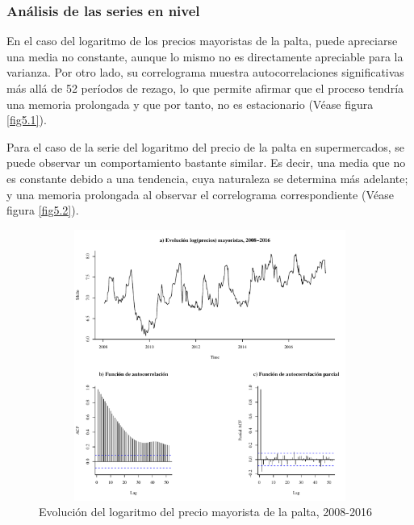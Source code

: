 \documentclass[12pt, twoside]{book}\usepackage[]{graphicx}\usepackage[]{color}
\newenvironment{knitrout}{}{} %
\numberwithin{equation}{section}
\numberwithin{theorem}{section}
\numberwithin{teorema}{section}
\numberwithin{defi}{section}
\numberwithin{prop}{section}
\numberwithin{defi}{section}
\theoremstyle{plain}
\begin{document}
\subsubsection{Análisis de las series en nivel}

En el caso del logaritmo de los precios mayoristas de la palta, puede apreciarse una media no constante, aunque lo mismo no es directamente apreciable  para la varianza. Por otro lado, su correlograma muestra autocorrelaciones significativas más allá de 52 períodos de rezago, lo que permite afirmar que el proceso tendría una memoria prolongada y que por tanto, no es estacionario (Véase figura \ref{fig5.1}).

Para el caso de la serie del logaritmo del precio de la palta en supermercados, se puede observar un comportamiento bastante similar. Es decir, una media que no es constante debido a una tendencia, cuya naturaleza se determina más adelante; y una memoria prolongada al observar el correlograma correspondiente (Véase figura \ref{fig5.2}).  


\begin{knitrout}
\color{fgcolor}\begin{figure}[H]

{\centering \includegraphics[width=4.5in,height=3.5in]{figure/fig-2_1-1} 

}

\caption{Evolución del logaritmo del precio mayorista de la palta, 2008-2016\label{fig5.1}}\label{fig:fig-2.1}
\end{figure}


\end{knitrout}
\end{document}
